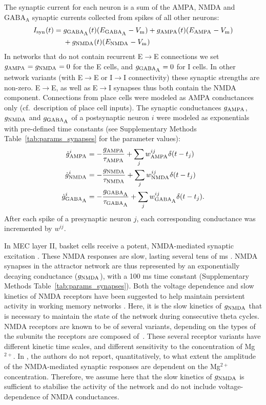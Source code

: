 \documentclass[a4paper,12pt]{article}
\newcommand{\ssc}[3]{\ensuremath{#1_{\text{#2}_{\text{#3}}}}}
\newcommand{\Vm}       {\ssc{V}      {m}     {}}
\newcommand{\Isyn}     {\ssc{I}      {syn}   {}}
\newcommand{\gGABAA}   {\ssc{g}      {\scriptsize{GABA}}{\scriptsize{A}}}
\newcommand{\EGABAA}   {\ssc{E}      {\scriptsize{GABA}}{\scriptsize{A}}}
\newcommand{\tauGABAA} {\ssc{\tau}   {\scriptsize{GABA}}{\scriptsize{A}}}
\newcommand{\gAMPA}    {\ssc{g}      {\scriptsize{AMPA}}{}}
\newcommand{\EAMPA}    {\ssc{E}      {\scriptsize{AMPA}}{}}
\newcommand{\tauAMPA}  {\ssc{\tau}   {\scriptsize{AMPA}}{}}
\newcommand{\gNMDA}    {\ssc{g}      {\scriptsize{NMDA}}{}}
\newcommand{\ENMDA}    {\ssc{E}      {\scriptsize{NMDA}}{}}
\newcommand{\tauNMDA}  {\ssc{\tau}   {\scriptsize{NMDA}}{}}
\newcommand{\dgAMPA} {\ssc{\dot{g}}{\scriptsize{AMPA}}{}}
\newcommand{\dgGABAA}{\ssc{\dot{g}}{\scriptsize{GABA}}{\scriptsize{A}}}
\newcommand{\dgNMDA} {\ssc{\dot{g}}{\scriptsize{NMDA}}{}}
\newcommand{\wAMPA   }{\ssc{w}      {\scriptsize{AMPA}}{}}
\newcommand{\wNMDA   }{\ssc{w}      {\scriptsize{NMDA}}{}}
\newcommand{\wGABAA  }{\ssc{w}      {\scriptsize{GABA}}{\scriptsize{A}}}
\begin{document}
The synaptic current for each neuron is a sum of the AMPA, NMDA and
$\text{GABA}_{\text{A}}$ synaptic currents collected from spikes of all other
neurons:
\begin{align}
    \Isyn(t)  = {} & \gGABAA(t) (\EGABAA - \Vm) + \gAMPA(t) (\EAMPA - \Vm) \notag \\
                & + \gNMDA(t) (\ENMDA - \Vm)
    \label{eq:I_syn}
\end{align}               
In networks that do not contain recurrent E$\rightarrow$E connections we set
$\gAMPA = \gNMDA = 0$ for the E cells, and $\gGABAA = 0$ for I cells. In other
network variants (with E$\rightarrow$E or I$\rightarrow$I connectivity) these
synaptic strengths are non-zero. E$\rightarrow$E, as well as E$\rightarrow$I
synapses thus both contain the NMDA component. Connections from place cells
were modeled as AMPA conductances only (cf.\ description of place cell inputs).
The synaptic conductances $\gAMPA$, $\gNMDA$ and $\gGABAA$ of a postsynaptic
neuron $i$ were modeled as exponentials with pre-defined time constants (see
Supplementary Methods Table~\ref{tab:params_synapses} for the parameter
values):
\begin{align}
    \dgAMPA^i  &=  -\frac{\gAMPA }{\tauAMPA}  + \sum_j \wAMPA^{ij}  \delta(t - t_j)\notag  \\
    \dgNMDA^i  &=  -\frac{\gNMDA }{\tauNMDA}  + \sum_j \wNMDA^{ij}  \delta(t - t_j)\notag  \\
    \dgGABAA^i &=  -\frac{\gGABAA}{\tauGABAA} + \sum_j \wGABAA^{ij} \delta(t - t_j).
    \label{eq:dgSyn}
\end{align}
After each spike of a presynaptic neuron $j$, each corresponding conductance
was incremented by $w^{ij}$.

In MEC layer II, basket cells receive a potent, NMDA-mediated synaptic
excitation \citep{JONES:1993je}. These NMDA responses are slow, lasting several
tens of ms \citep{JONES:1993je}. NMDA synapses in the attractor network are thus
represented by an exponentially decaying conductance ($\gNMDA$), with a 100 ms
time constant (Supplementary Methods Table~\ref{tab:params_synapses}).
Both the voltage dependence and slow kinetics of NMDA receptors have been
suggested to help maintain persistent activity in working memory networks
\citep{Wang:1999wt}.  Here, it is the slow kinetics of $\gNMDA$ that is
necessary to maintain the state of the network during consecutive theta cycles.
NMDA receptors are known to be of several variants, depending on the
types of the subunits the receptors are composed of~\citep{Paoletti:2013ht}.
These several receptor variants have different kinetic time scales, and
different sensitivity to the concentration of Mg$^{2+}$. In
\citep{JONES:1993je}, the authors
do not report, quantitatively, to what extent the amplitude of the
NMDA-mediated synaptic responses are dependent on the Mg$^{2+}$ concentration.
Therefore, we assume here that the slow kinetics of $\gNMDA$ is sufficient to
stabilise the activity of the network and do not include voltage-dependence of
NMDA conductances.
\end{document}
